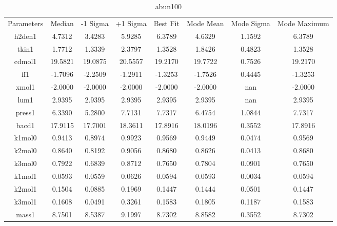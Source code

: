 \begin{table}
\caption{abun100}
\begin{tabular}{cccccccc}
Parameters & Median & -1 Sigma & +1 Sigma & Best Fit & Mode Mean & Mode Sigma & Mode Maximum \\
h2den1 & 4.7312 & 3.4283 & 5.9285 & 6.3789 & 4.6329 & 1.1592 & 6.3789 \\
tkin1 & 1.7712 & 1.3339 & 2.3797 & 1.3528 & 1.8426 & 0.4823 & 1.3528 \\
cdmol1 & 19.5821 & 19.0875 & 20.5557 & 19.2170 & 19.7722 & 0.7526 & 19.2170 \\
ff1 & -1.7096 & -2.2509 & -1.2911 & -1.3253 & -1.7526 & 0.4445 & -1.3253 \\
xmol1 & -2.0000 & -2.0000 & -2.0000 & -2.0000 & -2.0000 & nan & -2.0000 \\
lum1 & 2.9395 & 2.9395 & 2.9395 & 2.9395 & 2.9395 & nan & 2.9395 \\
press1 & 6.3390 & 5.2800 & 7.7131 & 7.7317 & 6.4754 & 1.0844 & 7.7317 \\
bacd1 & 17.9115 & 17.7001 & 18.3611 & 17.8916 & 18.0196 & 0.3552 & 17.8916 \\
k1mol0 & 0.9413 & 0.8974 & 0.9923 & 0.9569 & 0.9449 & 0.0474 & 0.9569 \\
k2mol0 & 0.8640 & 0.8192 & 0.9056 & 0.8680 & 0.8626 & 0.0413 & 0.8680 \\
k3mol0 & 0.7922 & 0.6839 & 0.8712 & 0.7650 & 0.7804 & 0.0901 & 0.7650 \\
k1mol1 & 0.0593 & 0.0559 & 0.0626 & 0.0594 & 0.0593 & 0.0034 & 0.0594 \\
k2mol1 & 0.1504 & 0.0885 & 0.1969 & 0.1447 & 0.1444 & 0.0501 & 0.1447 \\
k3mol1 & 0.1608 & 0.0491 & 0.3261 & 0.1583 & 0.1805 & 0.1187 & 0.1583 \\
mass1 & 8.7501 & 8.5387 & 9.1997 & 8.7302 & 8.8582 & 0.3552 & 8.7302 \\
\end{tabular}
\end{table}
